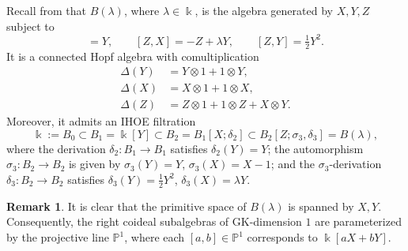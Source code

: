 \documentclass{article}
\theoremstyle{plain}
\theoremstyle{definition}
\newtheorem{remark}[thm]{Remark}
\numberwithin{equation}{section}
\begin{document}
	Recall from \cite{Zh13} that $B(\lambda)$, where $\lambda\in \Bbbk$, is the algebra generated by $X,Y,Z$ subject to
	\begin{equation*}
		[X,Y]=Y,\qquad [Z,X]=-Z+\lambda Y,\qquad [Z,Y]=\tfrac12 Y^{2}.
	\end{equation*}
	It is a connected Hopf algebra with comultiplication
	\begin{align*}
		\Delta(Y)&=Y\otimes1+1\otimes Y,\\
		\Delta(X)&=X\otimes1+1\otimes X,\\
		\Delta(Z)&=Z\otimes1+1\otimes Z+X\otimes Y.
	\end{align*}
	Moreover, it admits an IHOE filtration
	\[
	\Bbbk:=B_{0}\subset B_{1}=\Bbbk[Y]\subset B_{2}=
	B_{1}[X;\delta_{2}]\subset
	B_{2}[Z;\sigma_{3},\delta_{3}]=B(\lambda),
	\]
	where the derivation $\delta_{2}\colon B_{1} \to B_{1}$ satisfies
	$\delta_{2}(Y)=Y$; the automorphism $\sigma_{3}\colon B_{2}\to B_{2}$ is given by
	$\sigma_{3}(Y)=Y$, $\sigma_{3}(X)=X-1$; and the $\sigma_{3}$-derivation $\delta_{3}\colon B_{2} \to B_{2}$ satisfies
	$\delta_{3}(Y)=\tfrac12 Y^{2}$, $\delta_{3}(X)=\lambda Y$.
	
	\begin{remark}
		It is clear that the primitive space of $B(\lambda)$ is spanned by $X,Y$. Consequently, the right coideal subalgebras of GK-dimension $1$ are parameterized by the projective line $\mathbb{P}^{1}$, where each $[a,b]\in \mathbb{P}^{1}$ corresponds to $\Bbbk[aX+bY]$.    
	\end{remark}
	
\end{document}
